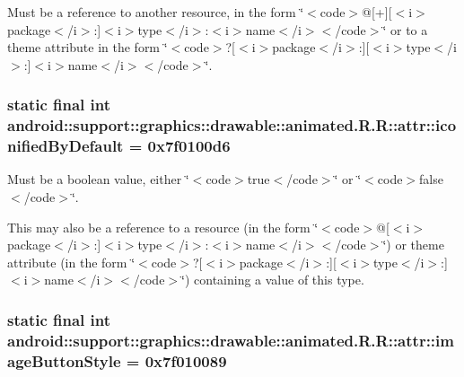 Must be a reference to another resource, in the form \char`\"{}$<$code$>$@\mbox{[}+\mbox{]}\mbox{[}$<$i$>$package$<$/i$>$:\mbox{]}$<$i$>$type$<$/i$>$:$<$i$>$name$<$/i$>$$<$/code$>$\char`\"{} or to a theme attribute in the form \char`\"{}$<$code$>$?\mbox{[}$<$i$>$package$<$/i$>$:\mbox{]}\mbox{[}$<$i$>$type$<$/i$>$:\mbox{]}$<$i$>$name$<$/i$>$$<$/code$>$\char`\"{}. \hypertarget{classandroid_1_1support_1_1graphics_1_1drawable_1_1animated_1_1_r_1_1attr_51b6834301725008d76f7d3c75efd8cd}{
\subsubsection[{iconifiedByDefault}]{\setlength{\rightskip}{0pt plus 5cm}static final int android::support::graphics::drawable::animated.R.R::attr::iconifiedByDefault = 0x7f0100d6}}
\label{classandroid_1_1support_1_1graphics_1_1drawable_1_1animated_1_1_r_1_1attr_51b6834301725008d76f7d3c75efd8cd}


Must be a boolean value, either \char`\"{}$<$code$>$true$<$/code$>$\char`\"{} or \char`\"{}$<$code$>$false$<$/code$>$\char`\"{}. 

This may also be a reference to a resource (in the form \char`\"{}$<$code$>$@\mbox{[}$<$i$>$package$<$/i$>$:\mbox{]}$<$i$>$type$<$/i$>$:$<$i$>$name$<$/i$>$$<$/code$>$\char`\"{}) or theme attribute (in the form \char`\"{}$<$code$>$?\mbox{[}$<$i$>$package$<$/i$>$:\mbox{]}\mbox{[}$<$i$>$type$<$/i$>$:\mbox{]}$<$i$>$name$<$/i$>$$<$/code$>$\char`\"{}) containing a value of this type. \hypertarget{classandroid_1_1support_1_1graphics_1_1drawable_1_1animated_1_1_r_1_1attr_73976054b2c7467f210a8d254091ff9c}{
\subsubsection[{imageButtonStyle}]{\setlength{\rightskip}{0pt plus 5cm}static final int android::support::graphics::drawable::animated.R.R::attr::imageButtonStyle = 0x7f010089}}
\label{classandroid_1_1support_1_1graphics_1_1drawable_1_1animated_1_1_r_1_1attr_73976054b2c7467f210a8d254091ff9c}


